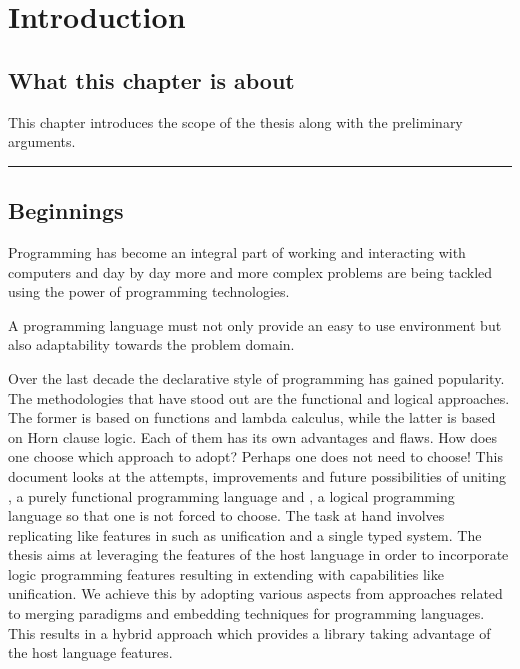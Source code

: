 \documentclass[thesis-solanki.tex]{subfiles}
\begin{document}
\chapter{Introduction}\label{chap:introduction}


\section{What this chapter is about}

This chapter introduces the scope of the thesis along with the preliminary arguments.


\noindent\rule{\textwidth}{0.5pt}


\section{Beginnings}

Programming has become an integral part of working and interacting with computers and day by day more and more complex
problems are being tackled using the power of programming technologies.

A programming language must not only provide an easy to use environment but also adaptability towards the problem domain.

Over the last decade the declarative style of programming has gained popularity.
The methodologies that have stood out are the functional and logical approaches.
The former is based on functions and lambda calculus, while the latter is based on Horn clause logic.
Each of them has its own advantages and flaws.
How does one choose which approach to adopt?
Perhaps one does not need to choose!
This document looks at the attempts, improvements and future possibilities of uniting , a purely
functional programming language and , a logical programming language so that one is not forced to
choose.
The task at hand involves replicating  like features in  such as unification and
a single typed system.
The thesis aims at leveraging the features of the host language in order to incorporate logic programming features
resulting in extending  with capabilities like unification.
We achieve this by adopting various aspects from approaches related to merging paradigms and embedding techniques
for programming languages.
This results in a hybrid approach which provides a library taking advantage of the host language features.
\end{document}
